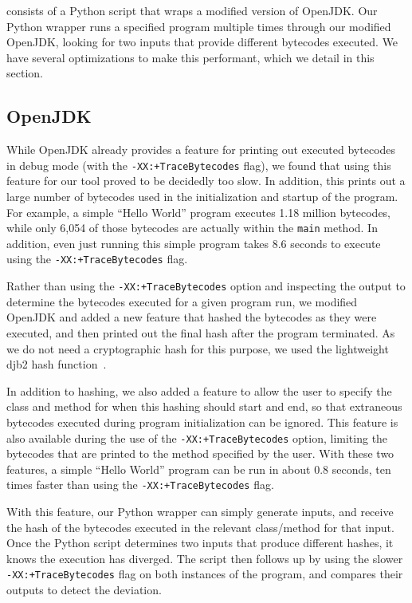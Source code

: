 
\jcupid consists of a Python script that wraps a modified version of OpenJDK.
Our Python wrapper runs a specified program multiple times through our modified
OpenJDK, looking for two inputs that provide different bytecodes executed. We
have several optimizations to make this performant, which we detail in this
section.

\subsection{OpenJDK}
\label{sec:OpenJDK}

While OpenJDK already provides a feature for printing out executed bytecodes in
debug mode (with the \texttt{-XX:+TraceBytecodes} flag), we found that using
this feature for our tool proved to be decidedly too slow. In addition,
this prints out a large number of bytecodes used in the initialization and
startup of the program. For example, a simple ``Hello World'' program executes
1.18 million bytecodes, while only 6,054 of those bytecodes are actually within
the \texttt{main} method. In addition, even just running this simple program
takes 8.6 seconds to execute using the \texttt{-XX:+TraceBytecodes} flag.

Rather than using the \texttt{-XX:+TraceBytecodes} option and inspecting the
output to determine the bytecodes executed for a given program run, we modified
OpenJDK and added a new feature that hashed the bytecodes as they were executed,
and then printed out the final hash after the program terminated. As we do not
need a cryptographic hash for this purpose, we used the lightweight djb2 hash
function~\cite{djb2Hash}.

In addition to hashing, we also added a feature to allow the user
to specify the class and method for when this hashing should start and end, so
that extraneous bytecodes executed during program initialization can be ignored.
This feature is also available during the use of the
\texttt{-XX:+TraceBytecodes} option, limiting the bytecodes that are printed to
the method specified by the user. With these two features, a simple ``Hello
World'' program can be run in about 0.8 seconds, ten times faster than using
the \texttt{-XX:+TraceBytecodes} flag.

With this feature, our Python wrapper can simply generate inputs, and receive
the hash of the bytecodes executed in the relevant class/method for that input.
Once the Python script determines two inputs that produce different hashes, it
knows the execution has diverged. The script then follows up by using the
slower \texttt{-XX:+TraceBytecodes} flag on both instances of the program, and
compares their outputs to detect the deviation. 

